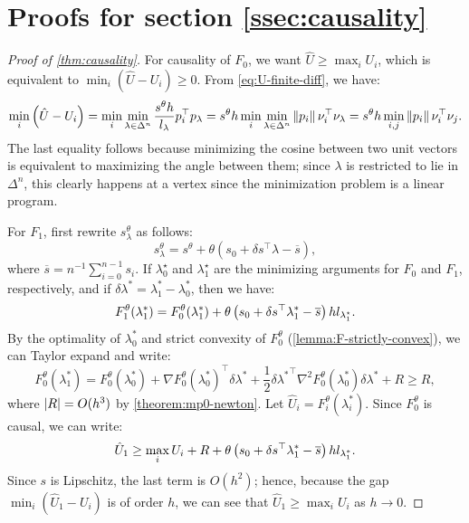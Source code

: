 \documentclass[sisc-eikonal.tex]{subfiles}
\begin{document}
\section{Proofs for section \ref{ssec:causality}}

\begin{proof}[Proof of \cref{thm:causality}]
  For causality of $F_0$, we want $\hat{U} \geq \max_i U_i$, which is
  equivalent to $\min_i(\hat{U} - U_i) \geq 0$. From
  \cref{eq:U-finite-diff}, we have:
  \begin{equation}
    \min_i \left(\hat{U} - U_i\right) = \min_i \min_{\lambda \in \Delta^n} \frac{s^\theta h}{l_\lambda} p_i^\top p_\lambda = s^\theta h \min_i \min_{\lambda \in \Delta^n} \left\|p_i\right\| \nu_i^\top \nu_{\lambda} = s^\theta h \min_{i, j} \left\|p_i\right\| \nu_i^\top \nu_j.
  \end{equation}
  The last equality follows because minimizing the cosine between two
  unit vectors is equivalent to maximizing the angle between them;
  since $\lambda$ is restricted to lie in $\Delta^n$, this clearly
  happens at a vertex since the minimization problem is a linear
  program.

  For $F_1$, first rewrite $s_\lambda^\theta$ as follows:
  \begin{equation}
    s_\lambda^\theta = s^\theta + \theta (s_0 + \delta s^\top \lambda - \overline{s}),
  \end{equation}
  where $\overline{s} = n^{-1} \sum_{i=0}^{n-1} s_i$. If
  $\lambda_0^\star$ and $\lambda_1^\star$ are the minimizing arguments
  for $F_0$ and $F_1$, respectively, and if
  $\delta \lambda^* = \lambda_1^* - \lambda_0^*$, then we have:
  \begin{equation}
    F_1^\theta(\lambda_1^*) = F_0^\theta(\lambda_1^*) + \theta \left(s_0 + \delta s^\top \lambda_1^* - \overline{s}\right) h l_{\lambda_1^\star}.
  \end{equation}
  By the optimality of $\lambda_0^*$ and strict convexity of
  $F_0^\theta$ (\cref{lemma:F-strictly-convex}), we can Taylor expand
  and write:
  \begin{equation}
    F_0^\theta(\lambda_1^*) = F_0^\theta(\lambda_0^*) + \nabla F_0^\theta(\lambda_0^*)^\top \delta \lambda^* + \frac{1}{2} {\delta \lambda^*}^\top \nabla^2 F_0^\theta(\lambda_0^*) \delta \lambda^* + R \geq R,
  \end{equation}
  where $\left|R\right| = O(h^3)$ by \cref{theorem:mp0-newton}. Let
  $\hat{U}_i = F_i^\theta(\lambda_i^*)$. Since $F_0^\theta$ is causal,
  we can write:
  \begin{equation}
    \hat{U}_1 \geq \max_i U_i + R + \theta \left(s_0 + \delta s^\top \lambda_1^* - \overline{s}\right) h l_{\lambda_1^*}.
  \end{equation}
  Since $s$ is Lipschitz, the last term is $O(h^2)$; hence, because
  the gap $\min_i(\hat{U}_1 - U_i)$ is of order $h$, we can see that
  $\hat{U}_1 \geq \max_i U_i$ as $h \to 0$.
\end{proof}
\end{document}
